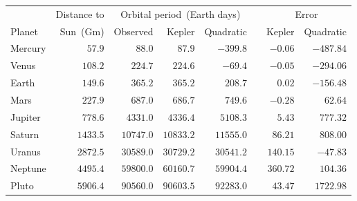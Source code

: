 \begin{tabular}{lrrrrrrr} \toprule
        & Distance to & \multicolumn{3}{c}{Orbital period~(Earth days)} && \multicolumn{2}{c}{Error} \\
  \cmidrule{3-5} \cmidrule{7-8}
Planet  & Sun~(Gm)    & Observed     & Kepler    & Quadratic && Kepler   & Quadratic \\\midrule
Mercury & $57.9$      & $88.0$       & $87.9$    & $-399.8$  && $-0.06$  & $-487.84$ \\
Venus   & $108.2$     & $224.7$      & $224.6$   & $-69.4$   && $-0.05$  & $-294.06$ \\
Earth   & $149.6$     & $365.2$      & $365.2$   & $208.7$   && $0.02$   & $-156.48$ \\
Mars    & $227.9$     & $687.0$      & $686.7$   & $749.6$   && $-0.28$  & $62.64$   \\
Jupiter & $778.6$     & $4331.0$     & $4336.4$  & $5108.3$  && $5.43$   & $777.32$  \\
Saturn  & $1433.5$    & $10747.0$    & $10833.2$ & $11555.0$ && $86.21$  & $808.00$  \\
Uranus  & $2872.5$    & $30589.0$    & $30729.2$ & $30541.2$ && $140.15$ & $-47.83$  \\
Neptune & $4495.4$    & $59800.0$    & $60160.7$ & $59904.4$ && $360.72$ & $104.36$  \\
Pluto   & $5906.4$    & $90560.0$    & $90603.5$ & $92283.0$ && $43.47$  & $1722.98$ \\\bottomrule
\end{tabular}
